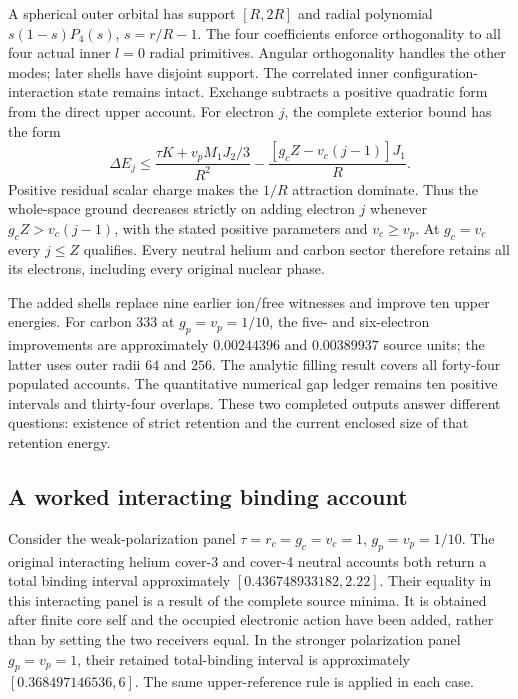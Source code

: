 A spherical outer orbital has support $[R,2R]$ and radial polynomial $s(1-s)P_4(s)$, $s=r/R-1$. The four coefficients enforce orthogonality to all four actual inner $l=0$ radial primitives. Angular orthogonality handles the other modes; later shells have disjoint support. The correlated inner configuration-interaction state remains intact. Exchange subtracts a positive quadratic form from the direct upper account. For electron $j$, the complete exterior bound has the form
\[
 \Delta E_j\leq\frac{\tau K+v_pM_1J_2/3}{R^2}
                  -\frac{[g_cZ-v_c(j-1)]J_1}{R}.
\]
Positive residual scalar charge makes the $1/R$ attraction dominate. Thus the whole-space ground decreases strictly on adding electron $j$ whenever $g_cZ>v_c(j-1)$, with the stated positive parameters and $v_c\geq v_p$. At $g_c=v_c$ every $j\leq Z$ qualifies. Every neutral helium and carbon sector therefore retains all its electrons, including every original nuclear phase.

The added shells replace nine earlier ion/free witnesses and improve ten upper energies. For carbon 333 at $g_p=v_p=1/10$, the five- and six-electron improvements are approximately $0.00244396$ and $0.00389937$ source units; the latter uses outer radii $64$ and $256$. The analytic filling result covers all forty-four populated accounts. The quantitative numerical gap ledger remains ten positive intervals and thirty-four overlaps. These two completed outputs answer different questions: existence of strict retention and the current enclosed size of that retention energy.

\subsection{A worked interacting binding account}

Consider the weak-polarization panel $\tau=r_c=g_c=v_c=1$, $g_p=v_p=1/10$. The original interacting helium cover-3 and cover-4 neutral accounts both return a total binding interval approximately $[0.436748933182,2.22]$. Their equality in this interacting panel is a result of the complete source minima. It is obtained after finite core self and the occupied electronic action have been added, rather than by setting the two receivers equal. In the stronger polarization panel $g_p=v_p=1$, their retained total-binding interval is approximately $[0.368497146536,6]$. The same upper-reference rule is applied in each case. 

